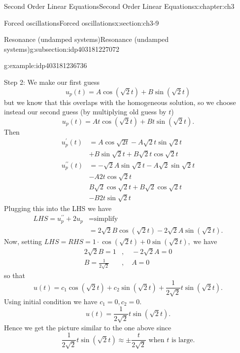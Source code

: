 \documentclass[oneside,10pt,]{book}
\numberwithin{equation}{section}
\numberwithin{equation}{section}
\newcommand{\amp}{&}
\begin{document}
\begin{chapterptx}{Second Order Linear Equations}{}{Second Order Linear Equations}{}{}{x:chapter:ch3}
\begin{sectionptx}{Forced oscillations}{}{Forced oscillations}{}{}{x:section:ch3-9}
\begin{subsectionptx}{Resonance (undamped systems)}{}{Resonance (undamped systems)}{}{}{g:subsection:idp403181227072}
\begin{example}{}{g:example:idp403181236736}
\par
Step 2: We make our first guess%
\begin{equation*}
u_{p}(t)=A\cos\left(\sqrt{2}t\right)+B\sin\left(\sqrt{2}t\right)
\end{equation*}
but we know that this overlaps with the homogeneous solution, so we choose instead our second guess (by multiplying old guess by \(t\))%
\begin{equation*}
u_{p}(t)=At\cos\left(\sqrt{2}t\right)+Bt\sin\left(\sqrt{2}t\right).
\end{equation*}
Then%
\begin{align*}
u_{p}^{\prime}(t) \amp =A\cos\sqrt{2t}-A\sqrt{2}t\sin\sqrt{2}t\\
\amp +B\sin\sqrt{2}t+B\sqrt{2}t\cos\sqrt{2}t\\
u_{p}^{\prime\prime}(t) \amp =-\sqrt{2}A\sin\sqrt{2}t-A\sqrt{2}\sin\sqrt{2}t\\
\amp -A2t\cos\sqrt{2}t\\
\amp B\sqrt{2}\cos\sqrt{2}t+B\sqrt{2}\cos\sqrt{2}t\\
\amp -B2t\sin\sqrt{2}t
\end{align*}
Plugging this into the LHS we have%
\begin{align*}
LHS=u_{p}^{\prime\prime}+2u_{p} \amp =\text{simplify}\\
\amp =2\sqrt{2}B\cos\left(\sqrt{2}t\right)-2\sqrt{2}A\sin\left(\sqrt{2}t\right).
\end{align*}
Now, setting \(LHS=RHS=1\cdot\cos\left(\sqrt{2}t\right)+0\sin\left(\sqrt{2}t\right),\) we have%
\begin{align*}
2\sqrt{2}B=1 \amp ,\,\,\,\,\,\,-2\sqrt{2}A=0\\
B=\frac{1}{2\sqrt{2}} \amp ,\,\,\,\,\,\,A=0
\end{align*}
so that%
\begin{equation*}
u(t)=c_{1}\cos\left(\sqrt{2}t\right)+c_{2}\sin\left(\sqrt{2}t\right)+\frac{1}{2\sqrt{2}}t\sin\left(\sqrt{2}t\right).
\end{equation*}
Using initial condition we have \(c_{1}=0,c_{2}=0\).%
\begin{equation*}
u(t)=\frac{1}{2\sqrt{2}}t\sin\left(\sqrt{2}t\right).
\end{equation*}
Hence we get the picture similar to the one above since%
\begin{equation*}
\frac{1}{2\sqrt{2}}t\sin\left(\sqrt{2}t\right)\approx\pm\frac{t}{2\sqrt{2}}\text{ when }t\text{ is large.}
\end{equation*}
%
\begin{sageinput}

\end{sageinput}
\end{example}
\end{subsectionptx}
\end{sectionptx}
\end{chapterptx}
\end{document}
